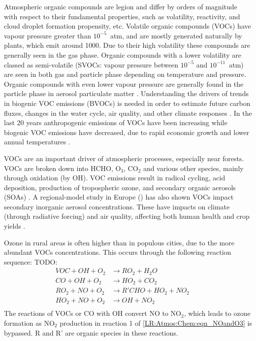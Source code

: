   Atmospheric organic compounds are legion and differ by orders of magnitude with respect to their fundamental properties, such as volatility, reactivity, and cloud droplet formation propensity, etc.
  Volatile organic compounds (VOCs) have vapour pressure greater than $10^{-5}$~atm, and are mostly generated naturally by plants, which emit around 1000\tgpyr \citep{Guenther1995, Glasius2016}.
  Due to their high volatility these compounds are generally seen in the gas phase.
  Organic compounds with a lower volatility are classed as semi-volatile (SVOCs: vapour pressure between $10^{-5}$ and $10^{-11}$~atm) are seen in both gas and particle phase depending on temperature and pressure.
  Organic compounds with even lower vapour pressure are generally found in the particle phase in aerosol particulate matter \citep{Glasius2016}.
  Understanding the drivers of trends in biogenic VOC emissions (BVOCs) is needed in order to estimate future carbon fluxes, changes in the water cycle, air quality, and other climate responses \citep{Yue2015}.
  In the last 20 years anthropogenic emissions of VOCs have been increasing while biogenic VOC emissions have decreased, due to rapid economic growth and lower annual temperatures \citep{Stavrakou2014, Kwon2017}.
  

  VOCs are an important driver of atmospheric processes, especially near forests.
  VOCs are broken down into HCHO, O$_3$, CO$_2$ and various other species, mainly through oxidation (by OH).
  VOC emissions result in radical cycling, acid deposition, production of tropospheric ozone, and secondary organic aerosols (SOAs) \citep{Atkinson2000, Kanakidou2005}.
  A regional-model study in Europe (\cite{Aksoyoglu2017}) has also shown VOCs impact secondary inorganic aerosol concentrations.
  These have impacts on climate (through radiative forcing) and air quality, affecting both human health and crop yields \citep{IPCC_Chapter2, Avnery2011, Lelieveld2015}.
  
  Ozone in rural areas is often higher than in populous cities, due to the more abundant VOCs concentrations.
  This occurs through the following reaction sequence: TODO: \cite{Sillman1999} %
  \begin{equation}
    \begin{aligned}
      VOC + OH + O_2   & \to RO_2 + H_2O       && \\%
      CO + OH + O_2    & \to HO_2 + CO_2       && \\%
      RO_2 + NO + O_2  & \to R'CHO+HO_2+NO_2   && \\%
      HO_2 + NO + O_2  & \to OH + NO_2         && \\%
    \end{aligned}
    \label{LR:VOCs:eqn_VOCandNO}
  \end{equation}
  The reactions of VOCs or CO with OH convert NO to NO$_2$, which leads to ozone formation as NO$_2$ production in reaction 1 of \ref{LR:Atmos:Chem:eqn_NOandO3} is bypassed.
  R and R' are organic species in these reactions.
  
